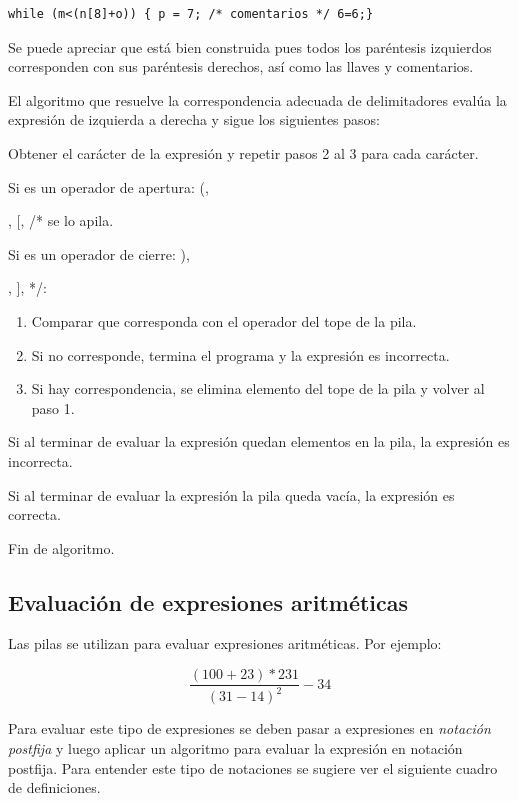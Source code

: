 \begin{lstlisting}[numbers=none]
while (m<(n[8]+o)) { p = 7; /* comentarios */ 6=6;}
\end{lstlisting}

Se puede apreciar que está bien construida pues todos los paréntesis izquierdos corresponden con sus paréntesis derechos, así como las llaves y comentarios. 

El algoritmo que resuelve la correspondencia adecuada de delimitadores evalúa la expresión de izquierda a derecha y sigue los siguientes pasos: 

\begin{enumerate}
	
\item Obtener el carácter de la expresión y repetir pasos 2 al 3 para cada carácter.
\item Si es un operador de apertura:  (,  {, [, /*   se lo apila.
\item Si es un operador de cierre: ), }, ], */:
	\begin{enumerate}
		\item Comparar que corresponda con el operador del tope de la pila. 
		\item Si no corresponde, termina el programa y la expresión es incorrecta.
		\item Si hay correspondencia, se elimina elemento del tope de la pila y volver al paso 1.
\end{enumerate}	
\item Si al terminar de evaluar la expresión quedan elementos en la pila, la expresión es incorrecta.
\item Si al terminar de evaluar la expresión la pila queda vacía, la expresión es correcta. 
\item Fin de algoritmo.
\end{enumerate}	

\subsection{Evaluación de expresiones aritméticas}
Las pilas se utilizan para evaluar expresiones aritméticas. Por ejemplo:

\begin{equation*}
	\frac{(100+23)\ast 231}{(31-14)^2}-34
\end{equation*}


Para evaluar este tipo de expresiones se deben pasar a expresiones en \textit{notación postfija} y luego aplicar un algoritmo para evaluar la expresión en notación postfija. Para entender este tipo de notaciones se sugiere ver el siguiente cuadro de definiciones.

